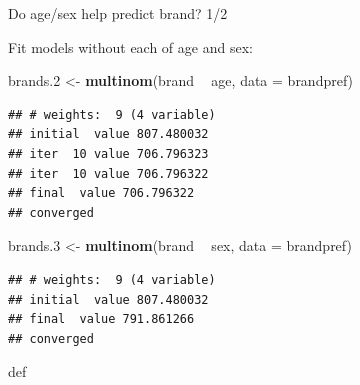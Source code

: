 \documentclass[ignorenonframetext,]{beamer}
\newenvironment{Shaded}{\begin{snugshade}}{\end{snugshade}}
\newcommand{\DataTypeTok}[1]{\textcolor[rgb]{0.13,0.29,0.53}{#1}}
\newcommand{\FloatTok}[1]{\textcolor[rgb]{0.00,0.00,0.81}{#1}}
\newcommand{\KeywordTok}[1]{\textcolor[rgb]{0.13,0.29,0.53}{\textbf{#1}}}
\newcommand{\NormalTok}[1]{#1}
\newcommand{\OperatorTok}[1]{\textcolor[rgb]{0.81,0.36,0.00}{\textbf{#1}}}
\newcommand{\StringTok}[1]{\textcolor[rgb]{0.31,0.60,0.02}{#1}}
\begin{document}
\begin{frame}[fragile]{Do age/sex help predict brand? 1/2}
\protect\hypertarget{do-agesex-help-predict-brand-12}{}

Fit models without each of age and sex:

\begin{Shaded}
\begin{Highlighting}[]
\NormalTok{brands}\FloatTok{.2}\NormalTok{ <-}\StringTok{ }\KeywordTok{multinom}\NormalTok{(brand }\OperatorTok{~}\StringTok{ }\NormalTok{age, }\DataTypeTok{data =}\NormalTok{ brandpref)}
\end{Highlighting}
\end{Shaded}

\begin{verbatim}
## # weights:  9 (4 variable)
## initial  value 807.480032 
## iter  10 value 706.796323
## iter  10 value 706.796322
## final  value 706.796322 
## converged
\end{verbatim}

\begin{Shaded}
\begin{Highlighting}[]
\NormalTok{brands}\FloatTok{.3}\NormalTok{ <-}\StringTok{ }\KeywordTok{multinom}\NormalTok{(brand }\OperatorTok{~}\StringTok{ }\NormalTok{sex, }\DataTypeTok{data =}\NormalTok{ brandpref)}
\end{Highlighting}
\end{Shaded}

\begin{verbatim}
## # weights:  9 (4 variable)
## initial  value 807.480032 
## final  value 791.861266 
## converged
\end{verbatim}

def

\end{frame}
\end{document}
